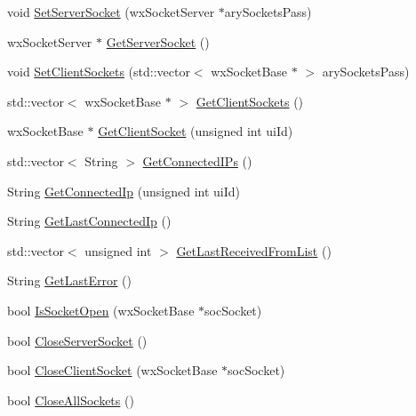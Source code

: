 \begin{DoxyCompactItemize}
\item 
void \hyperlink{class_rad_jav_1_1_networking_1_1wx_widgets_t_c_p_server_a21ae454e70bc0260f8d01ad5083777af}{Set\+Server\+Socket} (wx\+Socket\+Server $\ast$ary\+Sockets\+Pass)
\item 
wx\+Socket\+Server $\ast$ \hyperlink{class_rad_jav_1_1_networking_1_1wx_widgets_t_c_p_server_ae1f4dec7fb68f1c762921dcc5353207a}{Get\+Server\+Socket} ()
\item 
void \hyperlink{class_rad_jav_1_1_networking_1_1wx_widgets_t_c_p_server_a46bdd40b86883b4bb06ff2f9e0321f14}{Set\+Client\+Sockets} (std\+::vector$<$ wx\+Socket\+Base $\ast$ $>$ ary\+Sockets\+Pass)
\item 
std\+::vector$<$ wx\+Socket\+Base $\ast$ $>$ \hyperlink{class_rad_jav_1_1_networking_1_1wx_widgets_t_c_p_server_a5d7228ac2d9dcd086d802ae53e74e692}{Get\+Client\+Sockets} ()
\item 
wx\+Socket\+Base $\ast$ \hyperlink{class_rad_jav_1_1_networking_1_1wx_widgets_t_c_p_server_a2d084478069b180b4e9c620f9d4be0b5}{Get\+Client\+Socket} (unsigned int ui\+Id)
\item 
std\+::vector$<$ String $>$ \hyperlink{class_rad_jav_1_1_networking_1_1wx_widgets_t_c_p_server_a2858df181085713fead9af748f25b6d7}{Get\+Connected\+I\+Ps} ()
\item 
String \hyperlink{class_rad_jav_1_1_networking_1_1wx_widgets_t_c_p_server_a0c135ad9b5c2d0c73edc08f30f2605ab}{Get\+Connected\+Ip} (unsigned int ui\+Id)
\item 
String \hyperlink{class_rad_jav_1_1_networking_1_1wx_widgets_t_c_p_server_a620e9b2e3d4c05eeeed22d4552adac16}{Get\+Last\+Connected\+Ip} ()
\item 
std\+::vector$<$ unsigned int $>$ \hyperlink{class_rad_jav_1_1_networking_1_1wx_widgets_t_c_p_server_af2b4eaadea529cf1f6e63151b9413a43}{Get\+Last\+Received\+From\+List} ()
\item 
String \hyperlink{class_rad_jav_1_1_networking_1_1wx_widgets_t_c_p_server_a51fa80f98fe48895dce5770f27767347}{Get\+Last\+Error} ()
\item 
bool \hyperlink{class_rad_jav_1_1_networking_1_1wx_widgets_t_c_p_server_ac9b0cdd5491a9895e8cff62bef52dc95}{Is\+Socket\+Open} (wx\+Socket\+Base $\ast$soc\+Socket)
\item 
bool \hyperlink{class_rad_jav_1_1_networking_1_1wx_widgets_t_c_p_server_a4291efc7062de28205e7036588f9b09c}{Close\+Server\+Socket} ()
\item 
bool \hyperlink{class_rad_jav_1_1_networking_1_1wx_widgets_t_c_p_server_a142f15ba724b0383b0751330515abc29}{Close\+Client\+Socket} (wx\+Socket\+Base $\ast$soc\+Socket)
\item 
bool \hyperlink{class_rad_jav_1_1_networking_1_1wx_widgets_t_c_p_server_af70ece6952cd6131104ad9064db8988a}{Close\+All\+Sockets} ()
\end{DoxyCompactItemize}


